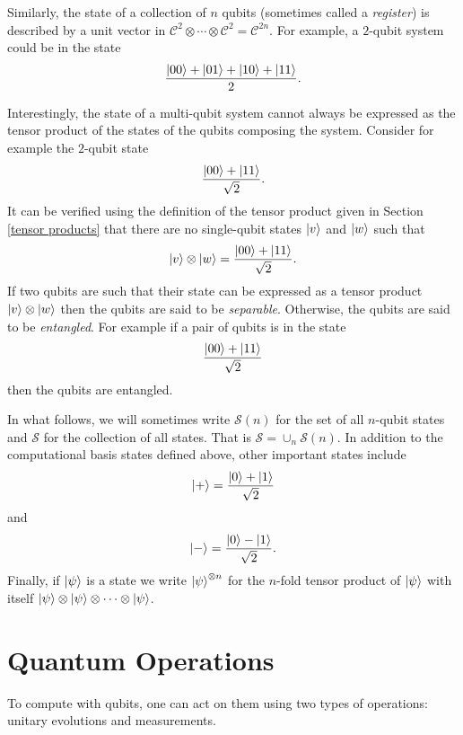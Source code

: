 \documentclass[12pt]{dalthesis}
\begin{document}
Similarly, the state of a collection of $n$ qubits (sometimes called a \emph{register}) is described by a unit vector in $\mathcal{C}^2 \otimes \cdots \otimes \mathcal{C}^2 = \mathcal{C}^{2n}$. For example, a $2$-qubit system could be in the state \[ \frac{\ket{00} + \ket{01} + \ket{10} + \ket{11}}{2}. \]

Interestingly, the state of a multi-qubit system cannot always be expressed as the tensor product of the states of the qubits composing the system. Consider for example the $2$-qubit state \[ \frac{\ket{00} + \ket{11}}{\sqrt{2}}. \]
It can be verified using the definition of the tensor product given in Section \ref{tensor products} that there are no single-qubit states $\ket{v}$ and $\ket{w}$ such that \[ \ket{v} \otimes \ket{w} = \frac{\ket{00} + \ket{11}}{\sqrt{2}}. \]
If two qubits are such that their state can be expressed as a tensor product $\ket{v} \otimes \ket{w}$ then the qubits are said to be \emph{separable}. Otherwise, the qubits are said to be \emph{entangled}.
For example if a pair of qubits is in the state \[ \frac{\ket{00} + \ket{11}}{\sqrt{2}} \] then the qubits are entangled.

In what follows, we will sometimes write $\mathcal{S}(n)$ for the set of all $n$-qubit states and $\mathcal{S}$ for the collection of all states. That is $\mathcal{S} = \cup_n \mathcal{S}(n)$. In addition to the computational basis states defined above, other important states include \[ \ket{+} = \frac{\ket{0} + \ket{1}}{\sqrt{2}} \] and \[ \ket{-} = \frac{\ket{0} - \ket{1}}{\sqrt{2}}. \]
Finally, if $\ket{\psi}$ is a state we write $\ket{\psi}^{\otimes n}$ for the $n$-fold tensor product of $\ket{\psi}$ with itself $\ket{\psi} \otimes \ket{\psi} \otimes \cdots \otimes \ket{\psi}$.

\section{Quantum Operations}
To compute with qubits, one can act on them using two types of operations: unitary evolutions and measurements.
\end{document}

